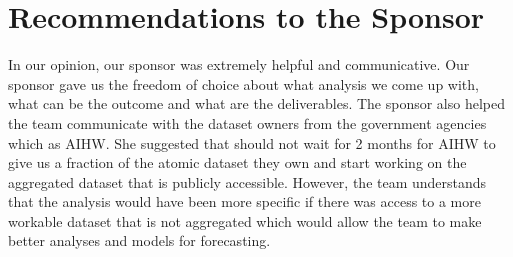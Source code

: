 \section{Recommendations to the Sponsor}
In our opinion, our sponsor was extremely helpful and communicative. Our sponsor gave us the freedom of choice about what analysis we come up with, what can be the outcome and what are the deliverables. The sponsor also helped the team communicate with the dataset owners from the government agencies which as AIHW. She suggested that should not wait for 2 months for AIHW to give us a fraction of the atomic dataset they own and start working on the aggregated dataset that is publicly accessible. However, the team understands that the analysis would have been more specific if there was access to a more workable dataset that is not aggregated which would allow the team to make better analyses and models for forecasting.